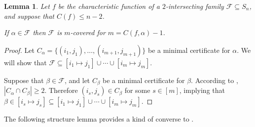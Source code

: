 \documentclass[10pt,a4paper]{amsart}
\newtheorem{lemma}[theorem]{Lemma}
\theoremstyle{definition}
\providecommand{\coset}[2]{[#1 \mapsto #2]}
\begin{document}
\begin{lemma} \label{lem:covering-sym}
Let $f$ be the characteristic function of a $2$-intersecting family $\mathcal{F} \subseteq S_n$, and suppose that $C(f) \leq n-2$.

If $\alpha \in \mathcal{F}$ then $\mathcal{F}$ is $m$-covered for $m = C(f,\alpha) - 1$.
\end{lemma}
\begin{proof}
Let $C_\alpha = \{(i_1,j_1),\ldots,(i_{m+1},j_{m+1})\}$ be a minimal certificate for $\alpha$. We will show that $\mathcal{F} \subseteq \coset{i_1}{j_1} \cup \cdots \cup \coset{i_m}{j_m}$.

Suppose that $\beta \in \mathcal{F}$, and let $C_\beta$ be a minimal certificate for $\beta$. According to , $|C_\alpha \cap C_\beta| \geq 2$. Therefore $(i_s,j_s) \in C_\beta$ for some $s \in [m]$, implying that $\beta \in \coset{i_s}{j_s} \subseteq \coset{i_1}{j_1} \cup \cdots \cup \coset{i_m}{j_m}$.
\end{proof}

The following structure lemma provides a kind of converse to .
\end{document}
